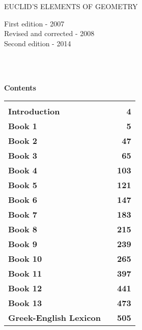 \thispagestyle{empty}
\begin{center}
{\Huge\sf EUCLID'S ELEMENTS OF GEOMETRY}\\
\mbox{}\spa\spa{}
\end{center}
\newpage

\thispagestyle{empty}
\begin{flushleft}
First edition - 2007\\
Revised and corrected - 2008\\
Second edition - 2014\\
~\\
\end{flushleft}

\newpage~\\
\thispagestyle{empty}
\begin{center}
{\Large\bf Contents}
\end{center}
\begin{tabular}{lcr}
&&\\[0.5ex]
{\bf Introduction}&\mbox{\hspace{12cm}}&{\bf 4}\\[3.ex]
{\bf Book 1}  && {\bf    5}\\[3.ex]
{\bf Book 2}  && {\bf  47}\\[3.ex]
{\bf Book 3}  && {\bf  65}\\[3.ex]
{\bf Book 4}  && {\bf 103}\\[3.ex]
{\bf Book 5}  && {\bf 121}\\[3.ex]
{\bf Book 6}  && {\bf  147}\\[3.ex]
{\bf Book 7}  && {\bf  183}\\[3.ex]
{\bf Book 8}  && {\bf  215}\\[3.ex]
{\bf Book 9}  && {\bf 239}\\[3.ex]
{\bf Book 10} &&{\bf 265}\\[3.ex]
{\bf Book 11}  && {\bf  397}\\[3.ex]
{\bf Book 12}  && {\bf 441}\\[3.ex]
{\bf Book 13} &&{\bf 473}\\[3.ex]
{\bf Greek-English Lexicon}&&{\bf 505}
\end{tabular}
\newpage

